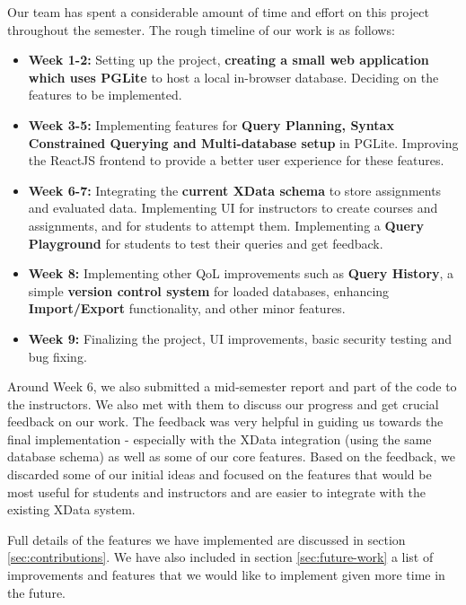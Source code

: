\documentclass[11pt]{article}
\begin{document}
\medskip

Our team has spent a considerable amount of time and effort on this project throughout the semester. The rough timeline of our work is as follows:

\begin{itemize}
    \item \textbf{Week 1-2:} Setting up the project, \textbf{creating a small web application which uses PGLite} to host a local in-browser database. Deciding on the features to be implemented.
    \item \textbf{Week 3-5:} Implementing features for \textbf{Query Planning, Syntax Constrained Querying and Multi-database setup} in PGLite. Improving the ReactJS frontend to provide a better user experience for these features.
    \item \textbf{Week 6-7:} Integrating the \textbf{current XData schema} to store assignments and evaluated data. Implementing UI for instructors to create courses and assignments, and for students to attempt them. Implementing a \textbf{Query Playground} for students to test their queries and get feedback. 
    \item \textbf{Week 8:} Implementing other QoL improvements such as \textbf{Query History}, a simple \textbf{version control system} for loaded databases, enhancing \textbf{Import/Export} functionality, and other minor features.
    \item \textbf{Week 9:} Finalizing the project, UI improvements, basic security testing and bug fixing.
\end{itemize}

Around Week 6, we also submitted a mid-semester report and part of the code to the instructors. We also met with them to discuss our progress and get crucial feedback on our work. The feedback was very helpful in guiding us towards the final implementation - especially with the XData integration (using the same database schema) as well as some of our core features. Based on the feedback, we discarded some of our initial ideas and focused on the features that would be most useful for students and instructors and are easier to integrate with the existing XData system.

\medskip

Full details of the features we have implemented are discussed in section \ref{sec:contributions}. We have also included in section \ref{sec:future-work} a list of improvements and features that we would like to implement given more time in the future.
\end{document}
